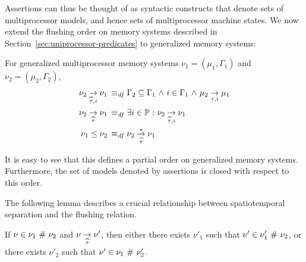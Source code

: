 \documentclass[11pt]{report}
\begin{document}
Assertions can thus be thought of as syntactic constructs that denote sets of multiprocessor models, and hence sets of multiprocessor machine states. We now extend the flushing order on memory systems described in Section~\ref{sec:uniprocessor-predicates} to generalized memory systems: 
\begin{definition}
  For generalized multiprocessor memory systems $\nu_1 = (\mu_1,\Gamma_1)$ and $\nu_2 = (\mu_2,\Gamma_2)$, \begin{align*}
    \nu_2 \underset{\widehat{\tau},i}{\rightarrow} \nu_1 \operatorname{\;\equiv_{\mathit{df}}\;} & \Gamma_2 \subseteq \Gamma_1 \operatorname{\,\wedge\,} i \in \Gamma_1 \operatorname{\,\wedge\,} \mu_2 \underset{\tau,i}{\rightarrow} \mu_1 \\ 
    \nu_2 \underset{\widehat{\tau}}{\rightarrow} \nu_1 \operatorname{\;\equiv_{\mathit{df}}\;} & \exists i \in \mathbb{P} \operatorname{\,:\,} \nu_2 \underset{\widehat{\tau},i}{\rightarrow} \nu_1 \\ 
    \nu_1 \leq \nu_2 \operatorname{\;\equiv_{\mathit{df}}\;} & \nu_2 \overset{\ast}{\underset{\widehat{\tau}}{\rightarrow}} \nu_1
  \end{align*}

\end{definition} It is easy to see that this defines a partial order on generalized memory systems. Furthermore, the set of models denoted by assertions is closed with respect to this order. 

The following lemma describes a crucial relationship between spatiotemporal separation and the flushing relation. 

\begin{lemma}
  \label{lem:separation-tau}
  If $\nu \in \nu_1 \operatorname{\,\#\,} \nu_2$ and $\nu \underset{\widehat{\tau}}{\rightarrow} \nu'$, then either there exists $\nu'_1$ such that $\nu' \in \nu'_1 \operatorname{\,\#\,} \nu_2$, or there exists $\nu'_2$ such that $\nu' \in \nu_1 \operatorname{\,\#\,} \nu'_2$.
\end{lemma}
\end{document}
